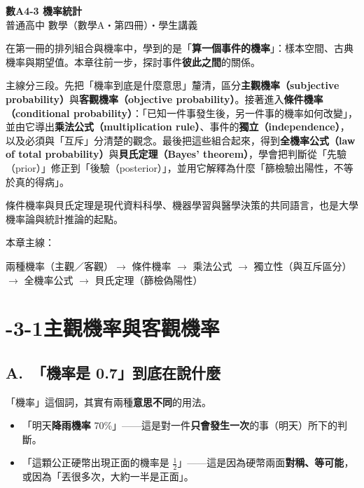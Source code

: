 \documentclass[11pt]{article}
\begin{document}
\begin{center}
{\sffamily\Huge\bfseries 數A4-3 機率統計}\\[3pt]
{\sffamily\large 普通高中 數學（數學A・第四冊）・學生講義}
\end{center}
\vspace{0.6em}

在第一冊的排列組合與機率中，學到的是「\textbf{算一個事件的機率}」：樣本空間、古典機率與期望值。本章往前一步，探討事件\textbf{彼此之間}的關係。

主線分三段。先把「機率到底是什麼意思」釐清，區分\textbf{主觀機率（subjective probability）}與\textbf{客觀機率（objective probability）}。接著進入\textbf{條件機率（conditional probability）}：「已知一件事發生後，另一件事的機率如何改變」，並由它導出\textbf{乘法公式（multiplication rule）}、事件的\textbf{獨立（independence）}，以及必須與「互斥」分清楚的觀念。最後把這些組合起來，得到\textbf{全機率公式（law of total probability）}與\textbf{貝氏定理（Bayes' theorem）}，學會把判斷從「先驗（prior）」修正到「後驗（posterior）」，並用它解釋為什麼「篩檢驗出陽性，不等於真的得病」。

條件機率與貝氏定理是現代資料科學、機器學習與醫學決策的共同語言，也是大學機率論與統計推論的起點。

\medskip
本章主線：

\begin{center}
兩種機率（主觀／客觀）$\rightarrow$ 條件機率 $\rightarrow$ 乘法公式 $\rightarrow$ 獨立性（與互斥區分）$\rightarrow$ 全機率公式 $\rightarrow$ 貝氏定理（篩檢偽陽性）
\end{center}

\section*{-3-1\quad 主觀機率與客觀機率}

\subsection*{\sffamily A.\ 「機率是 0.7」到底在說什麼}

「機率」這個詞，其實有兩種\textbf{意思不同}的用法。

\begin{itemize}\setlength{\itemsep}{1pt}
\item 「明天\textbf{降雨機率} 70\%」——這是對一件\textbf{只會發生一次}的事（明天）所下的判斷。
\item 「這顆公正硬幣出現正面的機率是 $\frac12$」——這是因為硬幣兩面\textbf{對稱、等可能}，或因為「丟很多次，大約一半是正面」。
\end{itemize}
\end{document}
